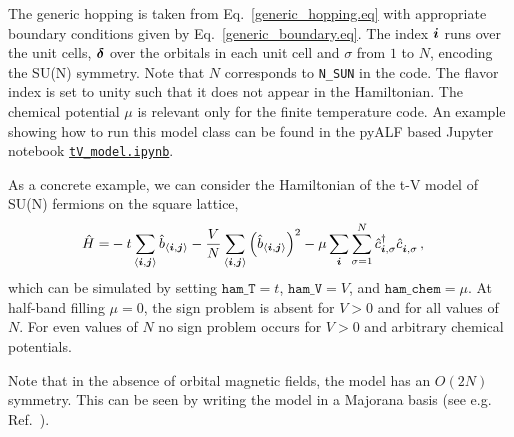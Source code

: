 The generic hopping is taken from Eq.~\eqref{generic_hopping.eq} with appropriate boundary conditions given by Eq.~\eqref{generic_boundary.eq}. The index $\boldsymbol{i}$ runs over the unit cells, $\boldsymbol{\delta}$ over the orbitals in each unit cell and $\sigma$  from $1$ to $N$,  encoding the SU(N) symmetry.
Note that $N$ corresponds to \texttt{N\_SUN}  in the code.
The flavor index is set to unity such that it does not appear in the  Hamiltonian.
The chemical potential $\mu$ is relevant only for the finite temperature code.
An example showing how to run this model class can be found in the pyALF based Jupyter notebook   
\href{https://git.physik.uni-wuerzburg.de/ALF/pyALF/-/blob/master/Notebooks/tV_model.ipynb}{\texttt{tV\_model.ipynb}}.

As a concrete example, we can consider the Hamiltonian of the t-V model of SU(N) fermions on the square lattice,
\begin{align}
\hat{H}= & -t \sum_{\langle \ve{i}, \ve{j} \rangle}  \hat{b}_{\langle \ve{i}, \ve{j} \rangle}
- \frac{V}{N} \sum_{\langle \ve{i}, \ve{j} \rangle}  \left(  \hat{b}_{\langle \ve{i}, \ve{j} \rangle}  \right)^2   - \mu \sum_{\ve{i}}  \sum_{\sigma =1}^{N} \hat{c}^{\dagger}_{\vec{i},\sigma } \hat{c}^{\phantom\dagger}_{\vec{i},\sigma } \,,
\end{align} 
which can be simulated by setting $\texttt{ham\_T}=t$, $\texttt{ham\_V} = V$, and $\texttt{ham\_chem}=\mu$.
At half-band filling $\mu =0$, the sign problem is absent for $V>0$ and for all values of $N$.  For even values of $N$ no sign problem occurs for $V>0$ and arbitrary chemical potentials.   

Note  that  in the absence of orbital magnetic fields,  the model has an $O(2N)$ symmetry. This can be seen by writing the model in a Majorana basis (see e.g. Ref.~\cite{Assaad16}). 








